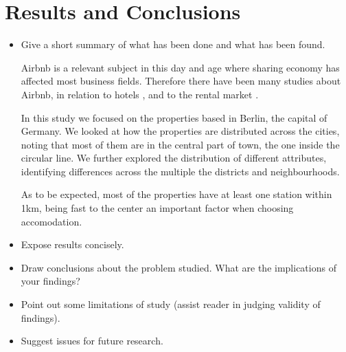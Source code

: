 \section{Results and Conclusions}\label{Sec:Conc}

\begin{itemize}

    \item Give a short summary of what has been done and what has been
    found.
    
Airbnb is a relevant subject in this day and age where sharing economy has affected most business fields. Therefore there have been many studies about Airbnb, in relation to hotels \citep{wang2017price}, and to the rental market \citep{coles2017airbnb}.

In this study we focused on the properties based in Berlin, the capital of Germany. We looked at how the properties are distributed across the cities, noting that most of them are in the central part of town, the one inside the circular line. We further explored the distribution of different attributes, identifying differences across the multiple the districts and neighbourhoods.

As to be expected, most of the properties have at least one station within 1km, being fast to the center an important factor when choosing accomodation.
    

    \item Expose results concisely.

    \item Draw conclusions about the problem studied. What are the
    implications of your findings?

    \item Point out some limitations of study (assist reader in judging validity
    of findings).

    \item Suggest issues for future research.

\end{itemize}
